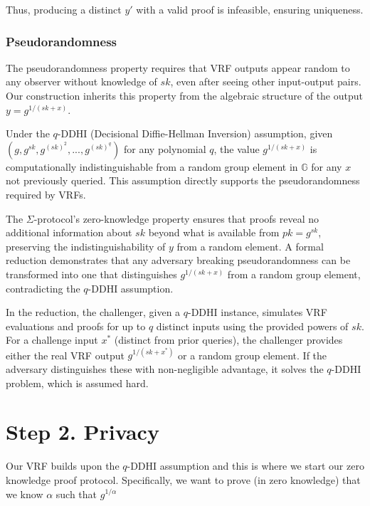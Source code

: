 Thus, producing a distinct $y'$ with a valid proof is infeasible, ensuring uniqueness.

\subsubsection{Pseudorandomness}
The pseudorandomness property requires that VRF outputs appear random to any observer without knowledge of $sk$, even after seeing other input-output pairs. Our construction inherits this property from the algebraic structure of the output $y = g^{1/(sk+x)}$.

Under the $q$-DDHI (Decisional Diffie-Hellman Inversion) assumption, given $(g, g^{sk}, g^{(sk)^2}, ..., g^{(sk)^q})$ for any polynomial $q$, the value $g^{1/(sk+x)}$ is computationally indistinguishable from a random group element in $\mathbb{G}$ for any $x$ not previously queried. This assumption directly supports the pseudorandomness required by VRFs.

The $\Sigma$-protocol's zero-knowledge property ensures that proofs reveal no additional information about $sk$ beyond what is available from $pk = g^{sk}$, preserving the indistinguishability of $y$ from a random element. A formal reduction demonstrates that any adversary breaking pseudorandomness can be transformed into one that distinguishes $g^{1/(sk+x)}$ from a random group element, contradicting the $q$-DDHI assumption.

In the reduction, the challenger, given a $q$-DDHI instance, simulates VRF evaluations and proofs for up to $q$ distinct inputs using the provided powers of $sk$. For a challenge input $x^*$ (distinct from prior queries), the challenger provides either the real VRF output $g^{1/(sk+x^*)}$ or a random group element. If the adversary distinguishes these with non-negligible advantage, it solves the $q$-DDHI problem, which is assumed hard.





















\section{Step 2. Privacy}
Our VRF builds upon the $q$-DDHI assumption and this is where we start our zero knowledge proof protocol. Specifically, we want to prove (in zero knowledge) that we know $\alpha$ such that $g^{1/\alpha}$ 

